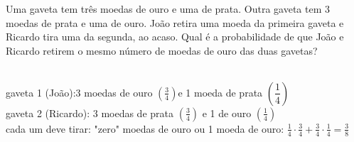 \begin{ex}
 Uma gaveta tem três moedas de ouro e uma de prata. Outra gaveta tem 3 moedas de prata e uma de ouro. João retira uma moeda da primeira gaveta e Ricardo tira uma da segunda, ao acaso. Qual é a probabilidade de que João e Ricardo retirem o mesmo número de moedas de ouro das duas gavetas?
   \begin{sol}
        \phantom{A} \\
     gaveta 1 (João):3 moedas de ouro $(\frac{3}{4})$e 1 moeda de prata $(\dfrac{1}{4})$\\
     gaveta 2 (Ricardo): 3 moedas de prata $(\frac{3}{4})$ e 1 de ouro $(\frac{1}{4})$\\
     cada um deve tirar: "zero" moedas de ouro ou 1 moeda de ouro: $\frac{1}{4}\cdot\frac{3}{4}+\frac{3}{4}\cdot\frac{1}{4}=\frac{3}{8}$
   \end{sol}
\end{ex}